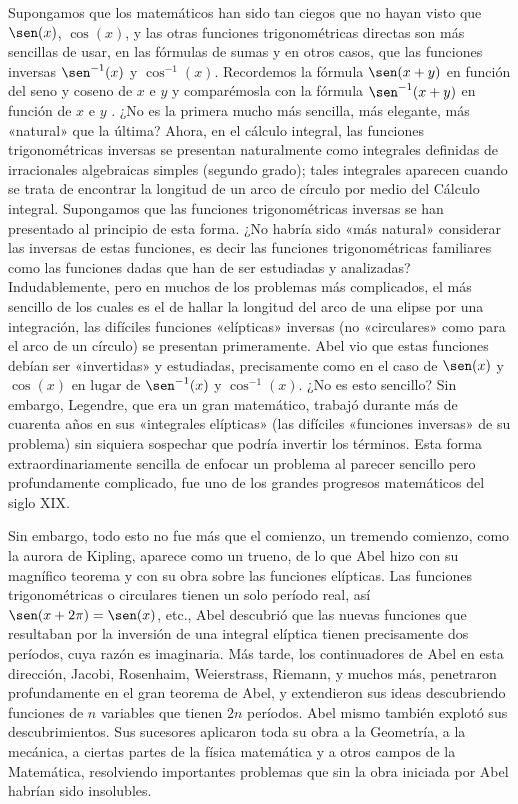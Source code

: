 \documentclass[a4paper, 12pt, draft]{article}
\begin{document}
Supongamos que los matemáticos han sido tan ciegos que no hayan visto que $\sen(x)$, $\cos(x)$, y las otras funciones trigonométricas directas son más sencillas de usar, en las fórmulas de sumas y en otros casos, que las funciones inversas $\sen^{-1}(x)$ y $\cos^{-1}(x)$. Recordemos la fórmula $\sen ( x + y )$ en función del seno y coseno de $x$ e $y$ y comparémosla con la fórmula $\sen^{-1} ( x + y)$ en función de $x$ e $y$ . ¿No es la primera mucho más sencilla, más elegante, más «natural» que la última? Ahora, en el cálculo integral, las funciones trigonométricas inversas se presentan naturalmente como integrales definidas de irracionales algebraicas simples (segundo grado); tales integrales aparecen cuando se trata de encontrar la longitud de un arco de círculo por medio del Cálculo integral. Supongamos que las funciones trigonométricas inversas se han presentado al principio de esta forma. ¿No habría sido «más natural» considerar las inversas de estas funciones, es decir las funciones trigonométricas familiares como las funciones dadas que han de ser estudiadas y analizadas? Indudablemente, pero en muchos de los problemas más complicados, el más sencillo de los cuales es el de hallar la longitud del arco de una elipse por una integración, las difíciles funciones «elípticas» inversas (no «circulares» como para el arco de un círculo) se presentan primeramente. Abel vio que estas funciones debían ser «invertidas» y estudiadas, precisamente como en el caso de $\sen(x)$ y $\cos(x)$ en lugar de $\sen^{-1}(x)$ y $\cos^{ -1}(x)$. ¿No es esto sencillo? Sin embargo, Legendre, que era un gran matemático, trabajó durante más de cuarenta años en sus «integrales elípticas» (las difíciles «funciones inversas» de su problema) sin siquiera sospechar que podría invertir los términos. Esta forma extraordinariamente sencilla de enfocar un problema al parecer sencillo pero profundamente complicado, fue uno de los grandes progresos matemáticos del siglo XIX.

Sin embargo, todo esto no fue más que el comienzo, un tremendo comienzo, como la aurora de Kipling, aparece como un trueno, de lo que Abel hizo con su magnífico teorema y con su obra sobre las funciones elípticas. Las funciones trigonométricas o circulares tienen un solo período real, así $\sen( x + 2 \pi ) = \sen (x)$, etc., Abel descubrió que las nuevas funciones que resultaban por la inversión de una integral elíptica tienen precisamente dos períodos, cuya razón es imaginaria. Más tarde, los continuadores de Abel en esta dirección, Jacobi, Rosenhaim, Weierstrass, Riemann, y muchos más, penetraron profundamente en el gran teorema de Abel, y extendieron sus ideas descubriendo funciones de $n$ variables que tienen $2n$ períodos. Abel mismo también explotó sus descubrimientos. Sus sucesores aplicaron toda su obra a la Geometría, a la mecánica, a ciertas partes de la física matemática y a otros campos de la Matemática, resolviendo importantes problemas que sin la obra iniciada por Abel habrían sido insolubles.
\end{document}

